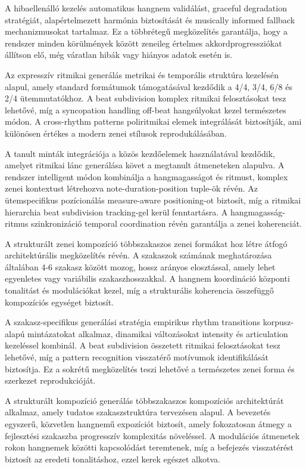 A hibaellenálló kezelés automatikus hangnem validálást, graceful degradation stratégiát, alapértelmezett harmónia biztosítását és musically informed fallback mechanizmusokat tartalmaz. Ez a többrétegű megközelítés garantálja, hogy a rendszer minden körülmények között zeneileg értelmes akkordprogressziókat állítson elő, még váratlan hibák vagy hiányos adatok esetén is.

Az expresszív ritmikai generálás metrikai és temporális struktúra kezelésén alapul, amely standard formátumok támogatásával kezdődik a 4/4, 3/4, 6/8 és 2/4 ütemmutatókhoz. A beat subdivision komplex ritmikai felosztásokat tesz lehetővé, míg a syncopation handling off-beat hangsúlyokat kezel természetes módon. A cross-rhythm patterns poliritmikai elemek integrálását biztosítják, ami különösen értékes a modern zenei stílusok reprodukálásában.

A tanult minták integrációja a közös kezdőelemek használatával kezdődik, amelyet ritmikai lánc generálása követ a megtanult átmeneteken alapulva. A rendszer intelligent módon kombinálja a hangmagasságot és ritmust, komplex zenei kontextust létrehozva note-duration-position tuple-ök révén. Az ütemspecifikus pozícionálás measure-aware positioning-ot biztosít, míg a ritmikai hierarchia beat subdivision tracking-gel kerül fenntartásra. A hangmagasság-ritmus szinkronizáció temporal coordination révén garantálja a zenei koherenciát.

A strukturált zenei kompozíció többszakaszos zenei formákat hoz létre átfogó architektúrális megközelítés révén. A szakaszok számának meghatározása általában 4-6 szakasz között mozog, hossz arányos elosztással, amely lehet egyenletes vagy variábilis szakaszhosszakkal. A hangnem koordináció központi tonalitást és modulációkat kezel, míg a strukturális koherencia összefüggő kompozíciós egységet biztosít.

A szakasz-specifikus generálási stratégia empirikus rhythm transitions korpusz-alapú mintázatokat alkalmaz, dinamikai változásokat intensity és articulation kezeléssel kombinál. A beat subdivision összetett ritmikai felosztásokat tesz lehetővé, míg a pattern recognition visszatérő motívumok identifikálását biztosítja. Ez a sokrétű megközelítés teszi lehetővé a természetes zenei forma és szerkezet reprodukcióját.

A strukturált kompozíció generálás többszakaszos kompozíciós architektúrát alkalmaz, amely tudatos szakaszstruktúra tervezésen alapul. A bevezetés egyszerű, közvetlen hangnemű expozíciót biztosít, amely fokozatosan átmegy a fejlesztési szakaszba progresszív komplexitás növeléssel. A modulációs átmenetek rokon hangnemek közötti kapcsolódást teremtenek, míg a befejezés visszatérést biztosít az eredeti tonalitáshoz, ezzel kerek egészet alkotva.

